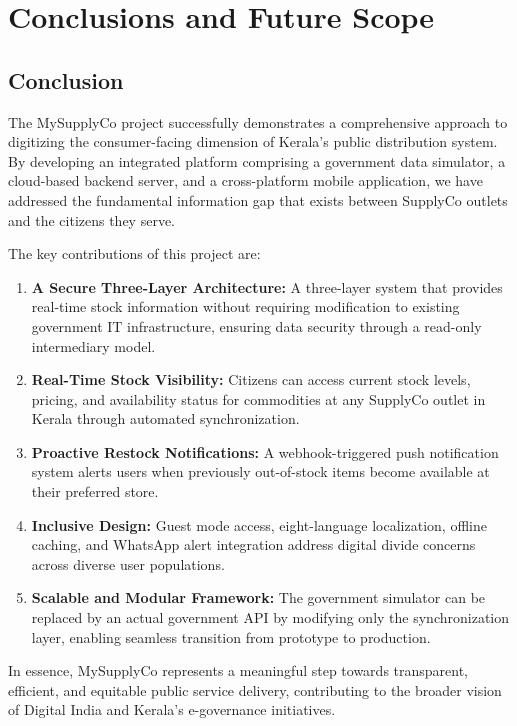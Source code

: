 \chapter{Conclusions and Future Scope}

\section{Conclusion}

The MySupplyCo project successfully demonstrates a comprehensive approach to digitizing the consumer-facing dimension of Kerala's public distribution system. By developing an integrated platform comprising a government data simulator, a cloud-based backend server, and a cross-platform mobile application, we have addressed the fundamental information gap that exists between SupplyCo outlets and the citizens they serve.

The key contributions of this project are:

\begin{enumerate}
    \item \textbf{A Secure Three-Layer Architecture:} A three-layer system that provides real-time stock information without requiring modification to existing government IT infrastructure, ensuring data security through a read-only intermediary model.

    \item \textbf{Real-Time Stock Visibility:} Citizens can access current stock levels, pricing, and availability status for commodities at any SupplyCo outlet in Kerala through automated synchronization.

    \item \textbf{Proactive Restock Notifications:} A webhook-triggered push notification system alerts users when previously out-of-stock items become available at their preferred store.

    \item \textbf{Inclusive Design:} Guest mode access, eight-language localization, offline caching, and WhatsApp alert integration address digital divide concerns across diverse user populations.

    \item \textbf{Scalable and Modular Framework:} The government simulator can be replaced by an actual government API by modifying only the synchronization layer, enabling seamless transition from prototype to production.
\end{enumerate}

In essence, MySupplyCo represents a meaningful step towards transparent, efficient, and equitable public service delivery, contributing to the broader vision of Digital India and Kerala's e-governance initiatives.

